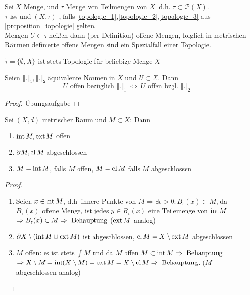 \begin{definition}[Topologie]
	Sei $X$ Menge, und $\tau$ Menge von Teilmengen von $X$, d.h. $\tau\subset\mathcal{P}(X)$.\\
	$\tau$ ist  und $(X,\tau)$ , falls \ref{topologie_1},\ref{topologie_2},\ref{topologie_3} aus \ref{proposition_topologie} gelten. \\
	Mengen $U\subset\tau$ heißen dann (per Definition) offene Mengen, folglich in metrischen Räumen definierte offene Mengen sind ein Spezialfall einer Topologie. \\
	\begin{underlinedenvironment}[beachte]
		$\tilde{\tau}=\{\emptyset, X\}$ ist stets Topologie für beliebige Menge $X$
	\end{underlinedenvironment}
\end{definition}

\begin{proposition}
	Seien $\Vert.\Vert_1, \Vert.\Vert_2$ äquivalente Normen in $X$ und $U\subset X$. Dann \[ U\text{ offen bezüglich } \Vert .\Vert_1\; \Leftrightarrow\; U\text{ offen bzgl. } \Vert .\Vert_2 \]
\end{proposition}
\begin{proof}
	Übungsaufgabe
\end{proof}

\begin{proposition}
	Sei $(X,d)$ metrischer Raum und $M\subset X$: Dann
	\begin{enumerate}[label={\arabic*)}]
		\item $\operatorname{int} M, \operatorname{ext} M$ offen
		\item $\partial M, \operatorname{cl} M$ abgeschlossen
		\item $M = \operatorname{int} M$, falls $M$ offen, $M=\operatorname{cl} M$ falls $M$ abgeschlossen
	\end{enumerate}
\end{proposition}
\begin{proof}
	\begin{enumerate}[label={\arabic*)}]
		\item Seien $x \in \operatorname{int} M$, d.h. innere Punkte von $M \Rightarrow \exists \epsilon > 0 \colon B_{\epsilon}(x) \subset M$, da $B_{\epsilon}(x)$ offene Menge, ist jedes $y \in B_{\epsilon}(x)$ eine Teilemenge von $\operatorname{int} M$ $\Rightarrow B_{\varepsilon}(x) \subset M \Rightarrow \text{ Behauptung}$ ($\operatorname{ext} M$ analog)
		\item $\partial X\setminus (\operatorname{int} M \cup \operatorname{ext} M)$ ist abgeschlossen, $\operatorname{cl} M = X\setminus\operatorname{ext} M$ abgeschlossen
		\item $M$ offen: es ist stets $\int M$ und da $M$ offen $M \subset \operatorname{int} M \Rightarrow \text{ Behauptung}$  $\Rightarrow X\setminus M = \operatorname{int}(X\setminus M) = \operatorname{ext} M = X \setminus \operatorname{cl} M \Rightarrow \text{ Behauptung}$.
		($M$ abgeschlossen analog)
	\end{enumerate}
\end{proof}